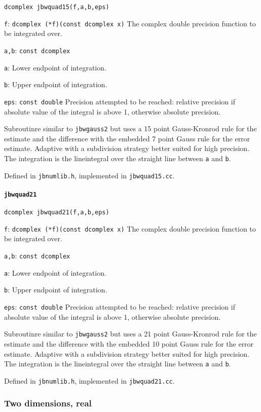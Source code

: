 \documentclass[12pt,a4paper]{article}
\newcommand{\mytt}[1]{\texttt{#1}}
\newcommand{\newfunction}[1]{\mytt{#1}\index{\mytt{#1}}}
\begin{document}
\mytt{dcomplex jbwquad15(f,a,b,eps)}

\mytt{f}: \mytt{dcomplex (*f)(const dcomplex x)} The complex double precision
function to be integrated over.

\mytt{a,b}: \mytt{const dcomplex}

\mytt{a}: Lower endpoint of integration.

\mytt{b}: Upper endpoint of integration.

\mytt{eps}: \mytt{const double} Precision attempted to be reached:
relative precision if absolute
value of the integral is above 1, otherwise absolute precision.

Subroutinre similar to \mytt{jbwgauss2} but uses a 15 point Gauss-Kronrod rule
for the estimate
and the difference with the embedded 7 point Gauss rule for the error estimate.
Adaptive with a subdivision strategy
better suited for high precision.
The integration is the
lineintegral over the straight line between \mytt{a} and \mytt{b}.

Defined in \mytt{jbnumlib.h}, implemented in \mytt{jbwquad15.cc}.

\paragraph{\newfunction{jbwquad21}}

\mytt{dcomplex jbwquad21(f,a,b,eps)}

\mytt{f}: \mytt{dcomplex (*f)(const dcomplex x)} The complex double precision
function to be integrated over.

\mytt{a,b}: \mytt{const dcomplex}

\mytt{a}: Lower endpoint of integration.

\mytt{b}: Upper endpoint of integration.

\mytt{eps}: \mytt{const double} Precision attempted to be reached:
relative precision if absolute
value of the integral is above 1, otherwise absolute precision.

Subroutinre similar to \mytt{jbwgauss2} but uses a 21 point Gauss-Kronrod rule
for the estimate
and the difference with the embedded 10 point Gauss rule for the error estimate.
Adaptive with a subdivision strategy
better suited for high precision.
The integration is the
lineintegral over the straight line between \mytt{a} and \mytt{b}.

Defined in \mytt{jbnumlib.h}, implemented in \mytt{jbwquad21.cc}.

\subsubsection{Two dimensions, real}
\end{document}
